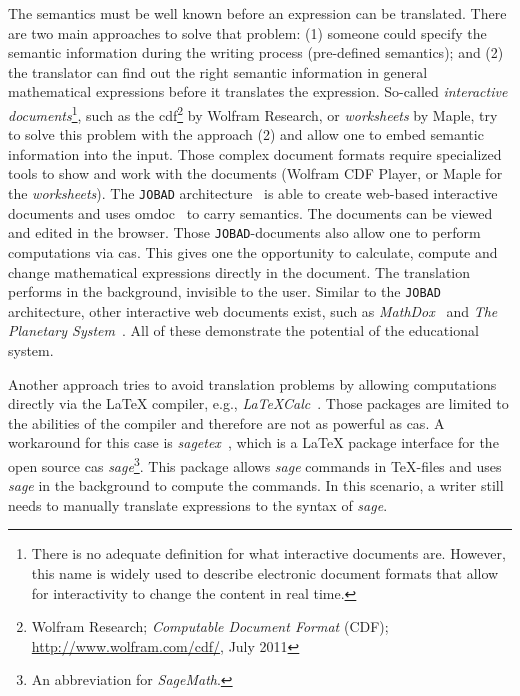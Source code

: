 \documentclass[a4paper,11pt]{article}
\newcommand{\Maple}{Maple}
\newcommand{\JOBAD}{{\tt JOBAD}}
\theoremstyle{defTheoStyle}
\theoremstyle{defExampStyle}
\begin{document}
The semantics must be well known before an expression can be translated. There are two main approaches to solve that problem: (1) someone could specify the semantic information during the writing process (pre-defined semantics); and (2) the translator can find out the right semantic information in general mathematical expressions before it translates the expression. So-called \textit{interactive documents}\footnote{There is no adequate definition for what interactive documents are. However, this name is widely used to describe electronic document formats that allow for interactivity to change the content in real time.}, such as the \gls*{cdf}\footnote{Wolfram Research; \textit{Computable Document Format} (CDF); \url{http://www.wolfram.com/cdf/}, July 2011} by Wolfram Research, or \textit{worksheets} by \Maple{}, try to solve this problem with the approach (2) and allow one to embed semantic information into the input. Those complex document formats require specialized tools to show and work with the documents (Wolfram CDF Player, or \Maple{} for the \textit{worksheets}). The \JOBAD{} architecture~\parencite{JOBAD:orig} is able to create web-based interactive documents and uses \gls*{omdoc}~\parencite{OMDoc} to carry semantics. The documents can be viewed and edited in the browser. Those \JOBAD{-documents} also allow one to perform computations via \gls*{cas}. This gives one the opportunity to calculate, compute and change mathematical expressions directly in the document. The translation performs in the background, invisible to the user. Similar to the \JOBAD{} architecture, other interactive web documents exist, such as \textit{MathDox}~\parencite{MathDox} and \textit{The Planetary System}~\parencite{Planetary}. All of these demonstrate the potential of the educational system.

Another approach tries to avoid translation problems by allowing computations directly via the \LaTeX{} compiler, e.g., \textit{LaTeXCalc}~\parencite{LatexCalc}. Those packages are limited to the abilities of the compiler and therefore are not as powerful as \gls*{cas}. A workaround for this case is \textit{sagetex}~\parencite{Sagetex}, which is a \LaTeX{} package interface for the open source \gls*{cas} \textit{sage}\footnote{An abbreviation for \textit{SageMath}.}. This package allows \textit{sage} commands in \TeX{-}files and uses \textit{sage} in the background to compute the commands. In this scenario, a writer still needs to manually translate expressions to the syntax of \textit{sage}.
\end{document}
